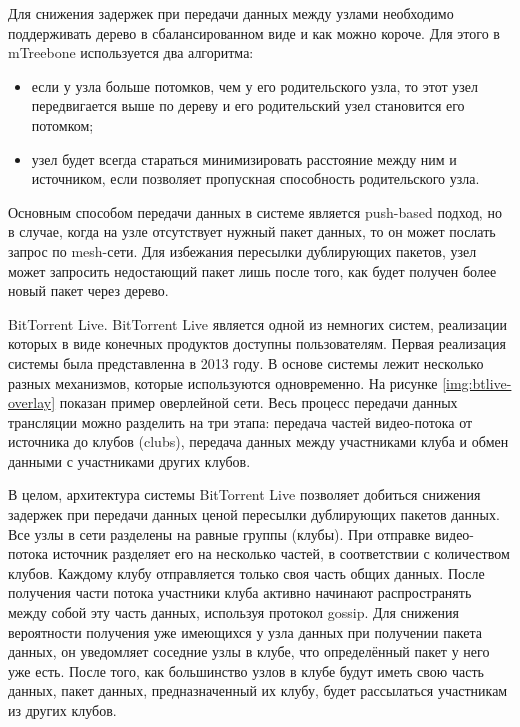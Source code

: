 		Для снижения задержек при передачи данных между узлами необходимо поддерживать дерево в сбалансированном виде и
		как можно короче. Для этого в mTreebone используется два алгоритма:
		\begin{itemize}
			\item если у узла больше потомков, чем у его родительского узла, то этот узел передвигается выше по дереву и
			его родительский узел становится его потомком;
			\item узел будет всегда стараться минимизировать расстояние между ним и источником, если позволяет
			пропускная способность родительского узла.
		\end{itemize}

		Основным способом передачи данных в системе является push-based подход, но в случае, когда на узле отсутствует
		нужный пакет данных, то он может послать запрос по mesh-сети. Для избежания пересылки дублирующих пакетов, узел
		может запросить недостающий пакет лишь после того, как будет получен более новый пакет через дерево.

		BitTorrent Live. BitTorrent Live \cite{6934295} является одной из немногих систем, реализации которых в виде конечных продуктов доступны
		пользователям. Первая реализация системы была представленна в 2013 году. В основе системы лежит несколько разных
		механизмов, которые используются одновременно. На рисунке \ref{img:btlive-overlay} показан пример оверлейной
		сети. Весь процесс передачи данных трансляции можно разделить на три этапа: передача частей видео-потока от
		источника до клубов (clubs), передача данных между участниками клуба и обмен данными с участниками
		других клубов.

		В целом, архитектура системы BitTorrent Live позволяет добиться снижения задержек при передачи данных ценой
		пересылки дублирующих пакетов данных. Все узлы в сети разделены на равные группы (клубы). При отправке
		видео-потока источник разделяет его на несколько частей, в соответствии с количеством клубов. Каждому клубу
		отправляется только своя часть общих данных. После получения части потока участники клуба активно начинают
		распространять между собой эту часть данных, используя протокол gossip. Для снижения вероятности
		получения уже имеющихся у узла данных при получении пакета данных, он уведомляет соседние узлы в клубе, что
		определённый пакет у него уже есть. После того, как большинство узлов в клубе будут иметь свою часть данных,
		пакет данных, предназначенный их клубу, будет рассылаться участникам из других клубов.

